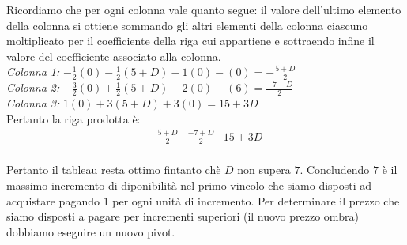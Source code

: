 \documentclass[10pt]{article}
\begin{document}
  Ricordiamo che per ogni colonna vale quanto segue:
  il valore dell'ultimo elemento della colonna
  si ottiene sommando gli altri elementi della colonna ciascuno
  moltiplicato per il coefficiente della riga cui appartiene
  e sottraendo infine il valore del coefficiente associato alla colonna.\\

  \noindent
  {\em Colonna 1:} $-\frac{1}{2}(0)-\frac{1}{2}(5+D)-1(0)-(0)=-\frac{5+D}{2}$\\
  {\em Colonna 2:} $-\frac{3}{2}(0)+\frac{1}{2}(5+D)-2(0)-(6)= \frac{-7+D}{2}$\\
  {\em Colonna 3:} $1(0)+3(5+D)+3(0) = 15+3D$\\

Pertanto la riga prodotta \`e:
\[
   \begin{array}{lll}
      -\frac{5+D}{2} & \frac{-7+D}{2} & 15+3D \\
   \end{array}
\]

Pertanto il tableau resta ottimo fintanto ch\`e
$D$ non supera $7$.
Concludendo $7$ \`e il massimo incremento di diponibilit\`a
nel primo vincolo che siamo disposti ad acquistare
pagando $1$ per ogni unit\`a di incremento.
Per determinare il prezzo 
che siamo disposti a pagare per incrementi superiori
(il nuovo prezzo ombra)
dobbiamo eseguire un nuovo pivot.

\bigskip
\end{document}
